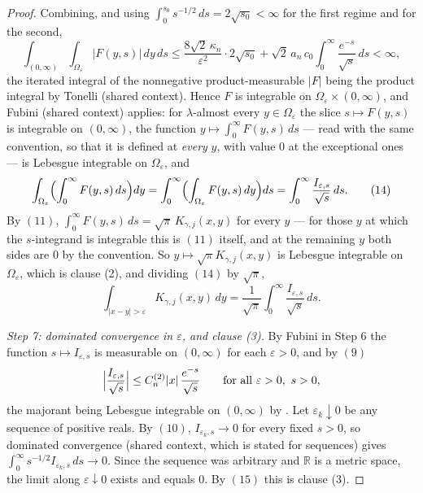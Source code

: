 \begin{proof}
Combining, and using $\int_0^{s_0}s^{-1/2}\,ds = 2\sqrt{s_0} < \infty$ for the
first regime and  for the second,
\[
  \int_{(0,\infty)}\!\!\int_{\Omega_\varepsilon}|F(y,s)|\,dy\,ds
    \leq \frac{8\sqrt2\,\kappa_n}{\varepsilon^2}\cdot 2\sqrt{s_0}
      + \sqrt2\,a_n\,c_0\int_0^\infty \frac{e^{-s}}{\sqrt s}\,ds
    < \infty ,
\]
the iterated integral of the nonnegative product-measurable $|F|$ being the
product integral by Tonelli (shared context).  Hence $F$ is integrable on
$\Omega_\varepsilon\times(0,\infty)$, and Fubini (shared context) applies: for
$\lambda$-almost every $y \in \Omega_\varepsilon$ the slice
$s \mapsto F(y,s)$ is integrable on $(0,\infty)$, the function
$y \mapsto \int_0^\infty F(y,s)\,ds$ --- read with the same convention, so that
it is defined at \emph{every} $y$, with value $0$ at the exceptional ones --- is
Lebesgue integrable on $\Omega_\varepsilon$, and
\begin{equation*}
  \int_{\Omega_\varepsilon}\Bigl(\int_0^\infty F(y,s)\,ds\Bigr)dy
    = \int_0^\infty\Bigl(\int_{\Omega_\varepsilon}F(y,s)\,dy\Bigr)ds
    = \int_0^\infty \frac{I_{\varepsilon,s}}{\sqrt s}\,ds . \tag{14}
\end{equation*}
By $(11)$, $\int_0^\infty F(y,s)\,ds = \sqrt\pi\,K_{\gamma,j}(x,y)$ for every
$y$ --- for those $y$ at which the $s$-integrand is integrable this is $(11)$
itself, and at the remaining $y$ both sides are $0$ by the convention.  So
$y \mapsto \sqrt\pi K_{\gamma,j}(x,y)$ is Lebesgue integrable on
$\Omega_\varepsilon$, which is clause (2), and dividing $(14)$ by $\sqrt\pi$,
\begin{equation*}
  \int_{|x-y|>\varepsilon}K_{\gamma,j}(x,y)\,dy
    = \frac{1}{\sqrt\pi}\int_0^\infty \frac{I_{\varepsilon,s}}{\sqrt s}\,ds .
  \tag{15}
\end{equation*}

\emph{Step 7: dominated convergence in $\varepsilon$, and clause (3).}
By Fubini in Step 6 the function $s \mapsto I_{\varepsilon,s}$ is measurable on
$(0,\infty)$ for each $\varepsilon > 0$, and by $(9)$
\[
  \Bigl|\frac{I_{\varepsilon,s}}{\sqrt s}\Bigr|
    \leq C^{(2)}_n|x|\,\frac{e^{-s}}{\sqrt s}
  \qquad\text{for all }\varepsilon>0,\ s>0 ,
\]
the majorant being Lebesgue integrable on $(0,\infty)$ by
.  Let $\varepsilon_k \downarrow 0$ be any
sequence of positive reals.  By $(10)$, $I_{\varepsilon_k,s} \to 0$ for every
fixed $s > 0$, so dominated convergence (shared context, which is stated for
sequences) gives
$\int_0^\infty s^{-1/2}I_{\varepsilon_k,s}\,ds \to 0$.  Since the sequence was
arbitrary and $\mathbb{R}$ is a metric space, the limit along
$\varepsilon\downarrow0$ exists and equals $0$.  By $(15)$ this is clause (3).
\end{proof}
